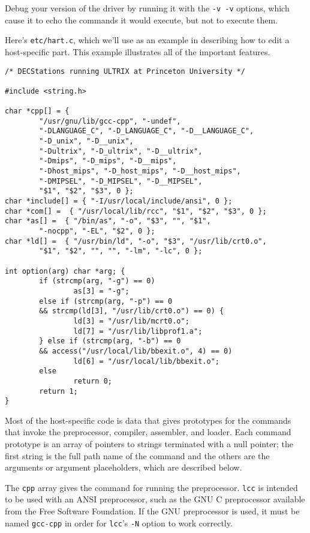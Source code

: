 Debug your version of the driver by running it
with the \verb|-v -v| options, which cause it to echo the
commands it would execute, but not to execute them.

Here's \verb|etc/hart.c|, which we'll use as an example
in describing how to edit a host-specific part.
This example illustrates all of the important features.
\begin{verbatim}
/* DECStations running ULTRIX at Princeton University */

#include <string.h>

char *cpp[] = {
        "/usr/gnu/lib/gcc-cpp", "-undef",
        "-DLANGUAGE_C", "-D_LANGUAGE_C", "-D__LANGUAGE_C",
        "-D_unix", "-D__unix",
        "-Dultrix", "-D_ultrix", "-D__ultrix",
        "-Dmips", "-D_mips", "-D__mips",
        "-Dhost_mips", "-D_host_mips", "-D__host_mips",
        "-DMIPSEL", "-D_MIPSEL", "-D__MIPSEL",
        "$1", "$2", "$3", 0 };
char *include[] = { "-I/usr/local/include/ansi", 0 };
char *com[] =  { "/usr/local/lib/rcc", "$1", "$2", "$3", 0 };
char *as[] =  { "/bin/as", "-o", "$3", "", "$1",
        "-nocpp", "-EL", "$2", 0 };
char *ld[] =  { "/usr/bin/ld", "-o", "$3", "/usr/lib/crt0.o",
        "$1", "$2", "", "", "-lm", "-lc", 0 };

int option(arg) char *arg; {
        if (strcmp(arg, "-g") == 0)
                as[3] = "-g";
        else if (strcmp(arg, "-p") == 0
        && strcmp(ld[3], "/usr/lib/crt0.o") == 0) {
                ld[3] = "/usr/lib/mcrt0.o";
                ld[7] = "/usr/lib/libprof1.a";
        } else if (strcmp(arg, "-b") == 0
        && access("/usr/local/lib/bbexit.o", 4) == 0)
                ld[6] = "/usr/local/lib/bbexit.o";
        else
                return 0;
        return 1;
}
\end{verbatim}

Most of the host-specific code is data that
gives prototypes for the commands that invoke
the preprocessor, compiler, assembler, and loader.
Each command prototype is an array of pointers to strings
terminated with a null pointer;
the first string is the full path name of the command and the others
are the arguments or argument placeholders, which are described below.

The \verb|cpp| array gives the command for running the preprocessor.
\verb|lcc| is intended to be used with an ANSI preprocessor,
such as the GNU C preprocessor available from the Free Software Foundation.
If the GNU preprocessor is used,
it must be named \verb|gcc-cpp| in order for \verb|lcc|'s \verb|-N| option
to work correctly.

